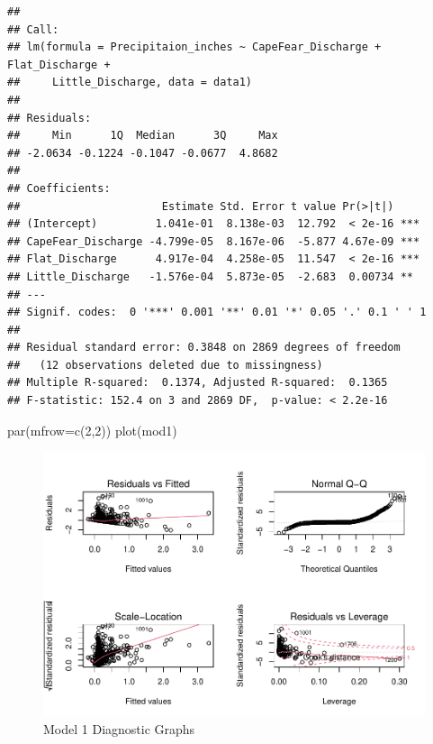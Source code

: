 \documentclass[
  12pt,
]{article}
\newenvironment{Shaded}{\begin{snugshade}}{\end{snugshade}}
\newcommand{\AttributeTok}[1]{\textcolor[rgb]{0.77,0.63,0.00}{#1}}
\newcommand{\DecValTok}[1]{\textcolor[rgb]{0.00,0.00,0.81}{#1}}
\newcommand{\FunctionTok}[1]{\textcolor[rgb]{0.00,0.00,0.00}{#1}}
\newcommand{\NormalTok}[1]{#1}
\begin{document}
\begin{verbatim}
## 
## Call:
## lm(formula = Precipitaion_inches ~ CapeFear_Discharge + Flat_Discharge + 
##     Little_Discharge, data = data1)
## 
## Residuals:
##     Min      1Q  Median      3Q     Max 
## -2.0634 -0.1224 -0.1047 -0.0677  4.8682 
## 
## Coefficients:
##                      Estimate Std. Error t value Pr(>|t|)    
## (Intercept)         1.041e-01  8.138e-03  12.792  < 2e-16 ***
## CapeFear_Discharge -4.799e-05  8.167e-06  -5.877 4.67e-09 ***
## Flat_Discharge      4.917e-04  4.258e-05  11.547  < 2e-16 ***
## Little_Discharge   -1.576e-04  5.873e-05  -2.683  0.00734 ** 
## ---
## Signif. codes:  0 '***' 0.001 '**' 0.01 '*' 0.05 '.' 0.1 ' ' 1
## 
## Residual standard error: 0.3848 on 2869 degrees of freedom
##   (12 observations deleted due to missingness)
## Multiple R-squared:  0.1374, Adjusted R-squared:  0.1365 
## F-statistic: 152.4 on 3 and 2869 DF,  p-value: < 2.2e-16
\end{verbatim}

\begin{Shaded}
\begin{Highlighting}[]
\FunctionTok{par}\NormalTok{(}\AttributeTok{mfrow=}\FunctionTok{c}\NormalTok{(}\DecValTok{2}\NormalTok{,}\DecValTok{2}\NormalTok{))}
\FunctionTok{plot}\NormalTok{(mod1)}
\end{Highlighting}
\end{Shaded}

\begin{figure}
\centering
\includegraphics{Project_files/figure-latex/river discharge and precipitation-1.pdf}
\caption{Model 1 Diagnostic Graphs}
\end{figure}
\end{document}
